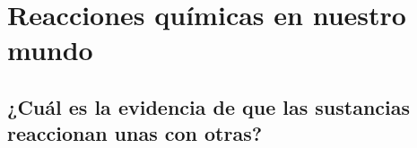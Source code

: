 \thispagestyle{plain}
\section{Reacciones químicas en nuestro mundo}
\subsection{¿Cuál es la evidencia de que las sustancias reaccionan unas con otras?}

\newpage